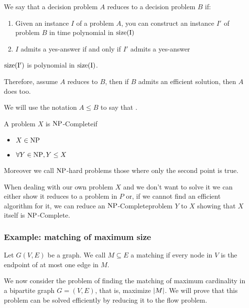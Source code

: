 \documentclass[12pt]{extarticle}
\newcommand{\NP}{{\operatorfont NP}}
\newcommand{\NPC}{$\NP$-Complete}
\begin{document}
We say that a decision problem $A$ reduces to a decision problem $B$ if:
\begin{enumerate}[label=\roman*.]
    \item Given an instance $I$ of a problem $A$, you can construct an instance $I'$ of problem $B$ in time polynomial in $\operatorfont{size}(I)$
    \item $I$ admits a yes-answer if and only if $I'$ admits a yes-answer
\end{enumerate}

\begin{remark}
    $\operatorfont{size}(I')$ is polynomial in $\operatorfont{size}(I)$.
\end{remark}

Therefore, assume $A$ reduces to $B$, then if $B$ admits an efficient solution, then $A$ does too.

We will use the notation $A \leq B$ to say that .

\begin{definition}[\NPC problem]
    A problem $X$ is \NPC if
    \begin{itemize}
        \item $X \in \NP$
        \item $\forall Y \in \NP, Y \leq X$
    \end{itemize}

    Moreover we call $\NP$-hard problems those where only the second point is true.
\end{definition}

When dealing with our own problem $X$ and we don't want to solve it we can either show it reduces to a problem in $P$ or, if we cannot find an efficient algorithm for it, we can reduce an \NPC problem $Y$ to $X$ showing that $X$ itself is \NPC.

\subsubsection{Example: matching of maximum size}

\begin{definition}[matching]
    Let $G(V, E)$ be a graph.
    We call $M \subseteq E$ a matching if every node in $V$ is the endpoint of at most one edge in $M$.
\end{definition}

We now consider the problem of finding the matching of maximum cardinality in a bipartite graph $G = (V,E)$, that is, maximize $\abs{M}$.
We will prove that this problem can be solved efficiently by reducing it to the flow problem.
\end{document}

